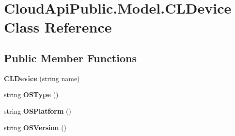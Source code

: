 \hypertarget{class_cloud_api_public_1_1_model_1_1_c_l_device}{\section{Cloud\-Api\-Public.\-Model.\-C\-L\-Device Class Reference}
\label{class_cloud_api_public_1_1_model_1_1_c_l_device}
}
\subsection*{Public Member Functions}
\begin{DoxyCompactItemize}
\item 
\hypertarget{class_cloud_api_public_1_1_model_1_1_c_l_device_af95db96a3c03ab7ff9bc3de2b6182fa1}{{\bfseries C\-L\-Device} (string name)}\label{class_cloud_api_public_1_1_model_1_1_c_l_device_af95db96a3c03ab7ff9bc3de2b6182fa1}

\item 
\hypertarget{class_cloud_api_public_1_1_model_1_1_c_l_device_a446c5e7855963087c5e6d989a2811093}{string {\bfseries O\-S\-Type} ()}\label{class_cloud_api_public_1_1_model_1_1_c_l_device_a446c5e7855963087c5e6d989a2811093}

\item 
\hypertarget{class_cloud_api_public_1_1_model_1_1_c_l_device_afcae67c613fa4cf1b749bc44e65e42e0}{string {\bfseries O\-S\-Platform} ()}\label{class_cloud_api_public_1_1_model_1_1_c_l_device_afcae67c613fa4cf1b749bc44e65e42e0}

\item 
\hypertarget{class_cloud_api_public_1_1_model_1_1_c_l_device_a5e6e682009994b8327882beb41ba66f0}{string {\bfseries O\-S\-Version} ()}\label{class_cloud_api_public_1_1_model_1_1_c_l_device_a5e6e682009994b8327882beb41ba66f0}

\end{DoxyCompactItemize}
